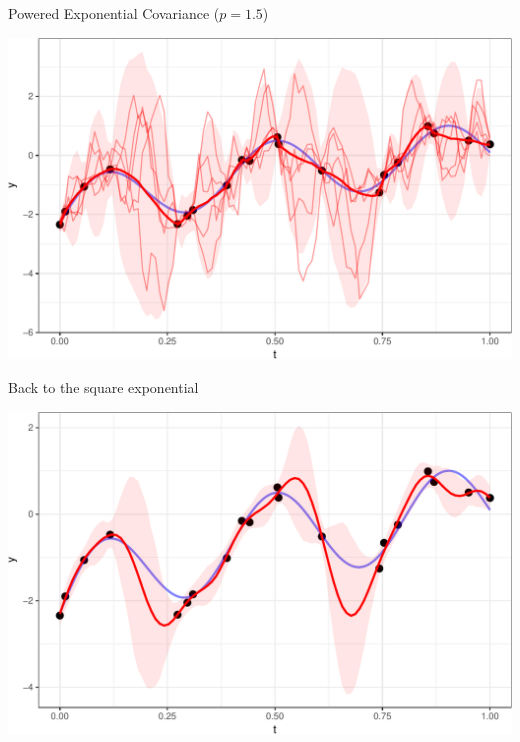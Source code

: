 \documentclass[11pt,ignorenonframetext,]{beamer}
\begin{document}
\begin{frame}{%
\protect\hypertarget{powered-exponential-covariance-p1.5}{%
Powered Exponential Covariance (\(p=1.5\))}}

\begin{center}\includegraphics[width=\textwidth]{Lec12_files/figure-beamer/unnamed-chunk-12-1} \end{center}

\end{frame}

\begin{frame}{%
\protect\hypertarget{back-to-the-square-exponential}{%
Back to the square exponential}}

\begin{center}\includegraphics[width=\textwidth]{Lec12_files/figure-beamer/unnamed-chunk-13-1} \end{center}

\end{frame}
\end{document}
